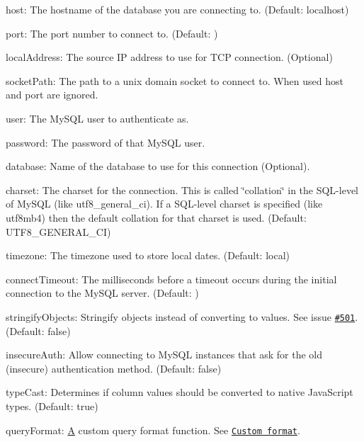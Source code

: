 \begin{DoxyItemize}
\item {\ttfamily host}\+: The hostname of the database you are connecting to. (Default\+: {\ttfamily localhost})
\item {\ttfamily port}\+: The port number to connect to. (Default\+: {})
\item {\ttfamily local\+Address}\+: The source I\+P address to use for T\+C\+P connection. (Optional)
\item {\ttfamily socket\+Path}\+: The path to a unix domain socket to connect to. When used {\ttfamily host} and {\ttfamily port} are ignored.
\item {\ttfamily user}\+: The My\+S\+Q\+L user to authenticate as.
\item {\ttfamily password}\+: The password of that My\+S\+Q\+L user.
\item {\ttfamily database}\+: Name of the database to use for this connection (Optional).
\item {\ttfamily charset}\+: The charset for the connection. This is called \char`\"{}collation\char`\"{} in the S\+Q\+L-\/level of My\+S\+Q\+L (like {\ttfamily utf8\+\_\+general\+\_\+ci}). If a S\+Q\+L-\/level charset is specified (like {\ttfamily utf8mb4}) then the default collation for that charset is used. (Default\+: {\ttfamily \textquotesingle{}U\+T\+F8\+\_\+\+G\+E\+N\+E\+R\+A\+L\+\_\+\+C\+I\textquotesingle{}})
\item {\ttfamily timezone}\+: The timezone used to store local dates. (Default\+: {\ttfamily \textquotesingle{}local\textquotesingle{}})
\item {\ttfamily connect\+Timeout}\+: The milliseconds before a timeout occurs during the initial connection to the My\+S\+Q\+L server. (Default\+: {})
\item {\ttfamily stringify\+Objects}\+: Stringify objects instead of converting to values. See issue \href{https://github.com/felixge/node-mysql/issues/501}{\tt \#501}. (Default\+: {\ttfamily \textquotesingle{}false\textquotesingle{}})
\item {\ttfamily insecure\+Auth}\+: Allow connecting to My\+S\+Q\+L instances that ask for the old (insecure) authentication method. (Default\+: {\ttfamily false})
\item {\ttfamily type\+Cast}\+: Determines if column values should be converted to native Java\+Script types. (Default\+: {\ttfamily true})
\item {\ttfamily query\+Format}\+: \hyperlink{class_a}{A} custom query format function. See \href{#custom-format}{\tt Custom format}.

\end{DoxyItemize}
